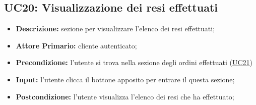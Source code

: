 \subsection{UC20: Visualizzazione dei resi effettuati}
\label{sec:UC20}
\begin{itemize}
    \item \textbf{Descrizione:} sezione per visualizzare l'elenco dei resi effettuati;
    \item \textbf{Attore Primario:} cliente autenticato;
    \item \textbf{Precondizione:} l'utente si trova nella sezione degli ordini effettuati (\hyperref[sec:UC21]{\underline{UC21}})
    \item \textbf{Input:} l'utente clicca il bottone apposito per entrare il questa sezione;
    \item \textbf{Postcondizione:} l'utente visualizza l'elenco dei resi che ha effettuato;
\end{itemize}